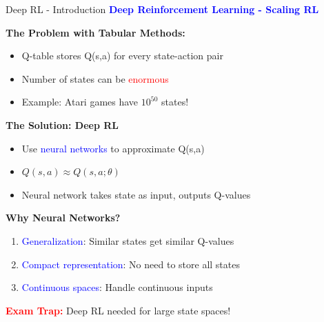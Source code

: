 \documentclass[8pt]{beamer}
\begin{document}
	\begin{frame}{Deep RL - Introduction}
		\fontsize{6.5}{7.5}\selectfont
		\textcolor{blue}{\textbf{Deep Reinforcement Learning - Scaling RL}}
		
		\textbf{The Problem with Tabular Methods:}
		\begin{itemize}
			\item Q-table stores Q(s,a) for every state-action pair
			\item Number of states can be \textcolor{red}{enormous}
			\item Example: Atari games have $10^{50}$ states!
		\end{itemize}
		
		\textbf{The Solution: Deep RL}
		\begin{itemize}
			\item Use \textcolor{blue}{neural networks} to approximate Q(s,a)
			\item $Q(s,a) \approx Q(s,a; \theta)$
			\item Neural network takes state as input, outputs Q-values
		\end{itemize}
		
		\textbf{Why Neural Networks?}
		\begin{enumerate}
			\item \textcolor{blue}{Generalization}: Similar states get similar Q-values
			\item \textcolor{blue}{Compact representation}: No need to store all states
			\item \textcolor{blue}{Continuous spaces}: Handle continuous inputs
		\end{enumerate}
		
		\textcolor{red}{\textbf{Exam Trap:}} Deep RL needed for large state spaces!
	\end{frame}
	
\end{document}
